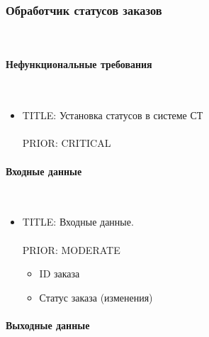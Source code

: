 \subsubsection{Обработчик статусов заказов} \mbox{} \\ \label{service_order_status_processing}
  
  \paragraph{Нефункциональные требования} \mbox{} \\

    \begin{itemize}

         \item {
           TITLE: Установка статусов в системе СТ\\
           \\
           PRIOR: CRITICAL\\
         }

         \end{itemize}

	\paragraph{Входные данные} \mbox{} \\ \label{}

      \begin{itemize}

        \item{

          TITLE: Входные данные.\\
          \\
          PRIOR: MODERATE\\

        }

          \begin{itemize}
            \item ID заказа
            \item Статус заказа (изменения)
          \end{itemize}

      \end{itemize}

  \paragraph{Выходные данные} \mbox{} \\

